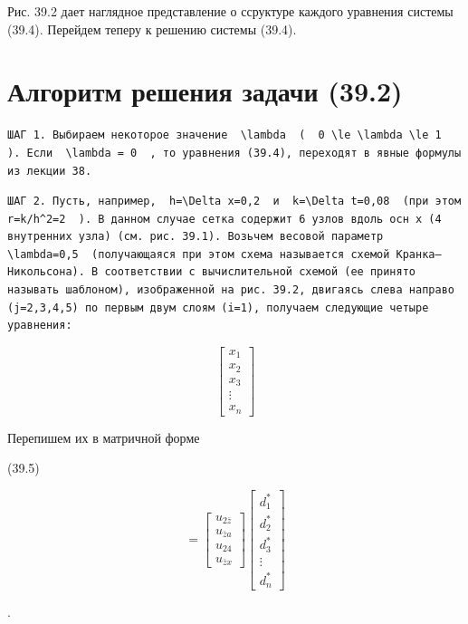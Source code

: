 \documentclass[
  ukrainian,
]{article}
\begin{document}
Рис. 39.2 дает наглядное представление о ссруктуре каждого уравнения
системы (39.4). Перейдем теперу к решению системы (39.4).

\section{Алгоритм решения задачи
(39.2)}\label{ux430ux43bux433ux43eux440ux438ux442ux43c-ux440ux435ux448ux435ux43dux438ux44f-ux437ux430ux434ux430ux447ux438-39.2}

\begin{verbatim}
ШАГ 1. Выбираем некоторое значение  \lambda  (  0 \le \lambda \le 1  ). Если  \lambda = 0  , то уравнения (39.4), переходят в явные формулы из лекции 38.
\end{verbatim}

\begin{verbatim}
ШАГ 2. Пусть, например,  h=\Delta x=0,2  и  k=\Delta t=0,08  (при этом  r=k/h^2=2  ). В данном случае сетка содержит 6 узлов вдоль осн x (4 внутренних узла) (см. рис. 39.1). Возьчем весовой параметр  \lambda=0,5  (получающаяся при этом схема называется схемой Кранка—Никольсона). В соответствии с вычислительной схемой (ее принято называть шаблоном), изображенной на рис. 39.2, двигаясь слева направо (j=2,3,4,5) по первым двум слоям (i=1), получаем следующие четыре уравнения:
\end{verbatim}

\[
\begin{bmatrix} x_1 \\ x_2 \\ x_3 \\ \vdots \\ x_n \end{bmatrix}
\]

Перепишем их в матричной форме

(39.5)

\[
=
\begin{bmatrix} u_{2\bar{z}} \\ u_{\bar{z}a} \\ u_{24} \\ u_{\bar{z}x} \end{bmatrix}
\begin{bmatrix} d_1^* \\ d_2^* \\ d_3^* \\ \vdots \\ d_n^* \end{bmatrix}
\]

.
\end{document}
